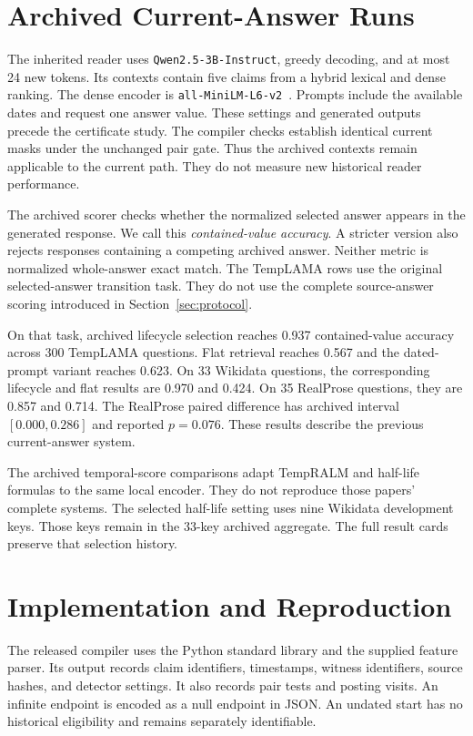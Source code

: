\section{Archived Current-Answer Runs}
\label{app:legacy}

The inherited reader uses \texttt{Qwen2.5-3B-Instruct}, greedy decoding, and at most 24 new tokens.
Its contexts contain five claims from a hybrid lexical and dense ranking.
The dense encoder is \texttt{all-MiniLM-L6-v2}~\citep{reimers2019sbert}.
Prompts include the available dates and request one answer value.
These settings and generated outputs precede the certificate study.
The compiler checks establish identical current masks under the unchanged pair gate.
Thus the archived contexts remain applicable to the current path.
They do not measure new historical reader performance.


The archived scorer checks whether the normalized selected answer appears in the generated response.
We call this \emph{contained-value accuracy}.
A stricter version also rejects responses containing a competing archived answer.
Neither metric is normalized whole-answer exact match.
The TempLAMA rows use the original selected-answer transition task.
They do not use the complete source-answer scoring introduced in Section~\ref{sec:protocol}.

On that task, archived lifecycle selection reaches 0.937 contained-value accuracy across 300 TempLAMA questions.
Flat retrieval reaches 0.567 and the dated-prompt variant reaches 0.623.
On 33 Wikidata questions, the corresponding lifecycle and flat results are 0.970 and 0.424.
On 35 RealProse questions, they are 0.857 and 0.714.
The RealProse paired difference has archived interval $[0.000,0.286]$ and reported $p=0.076$.
These results describe the previous current-answer system.

The archived temporal-score comparisons adapt TempRALM and half-life formulas to the same local encoder.
They do not reproduce those papers' complete systems.
The selected half-life setting uses nine Wikidata development keys.
Those keys remain in the 33-key archived aggregate.
The full result cards preserve that selection history.

\section{Implementation and Reproduction}
\label{app:reproduction}

The released compiler uses the Python standard library and the supplied feature parser.
Its output records claim identifiers, timestamps, witness identifiers, source hashes, and detector settings.
It also records pair tests and posting visits.
An infinite endpoint is encoded as a null endpoint in JSON.
An undated start has no historical eligibility and remains separately identifiable.

